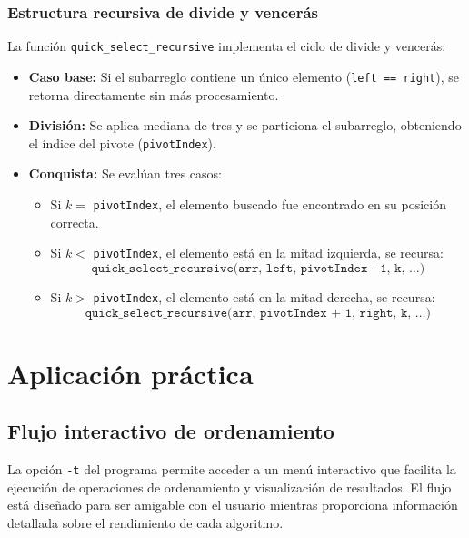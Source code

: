 \subsubsection{Estructura recursiva de divide y vencerás}

La función \texttt{quick\_select\_recursive} implementa el ciclo de divide y vencerás:

\begin{itemize}
    \item \textbf{Caso base:} Si el subarreglo contiene un único elemento (\texttt{left == right}), se retorna directamente sin más procesamiento.
    
    \item \textbf{División:} Se aplica mediana de tres y se particiona el subarreglo, obteniendo el índice del pivote (\texttt{pivotIndex}).
    
    \item \textbf{Conquista:} Se evalúan tres casos:
    \begin{itemize}
        \item Si \(k =\) \texttt{pivotIndex}, el elemento buscado fue encontrado en su posición correcta.
        \item Si \(k <\) \texttt{pivotIndex}, el elemento está en la mitad izquierda, se recursa:
        \[
        	\texttt{quick\_select\_recursive(arr, left, pivotIndex - 1, k, \ldots)}
        \]
        \item Si \(k >\) \texttt{pivotIndex}, el elemento está en la mitad derecha, se recursa:
        \[
        	\texttt{quick\_select\_recursive(arr, pivotIndex + 1, right, k, \ldots)}
        \]
    \end{itemize}
\end{itemize}

\section{Aplicación práctica}

\subsection{Flujo interactivo de ordenamiento}

La opción \texttt{-t} del programa permite acceder a un menú interactivo que facilita la ejecución de operaciones de ordenamiento y visualización de resultados. El flujo está diseñado para ser amigable con el usuario mientras proporciona información detallada sobre el rendimiento de cada algoritmo.

